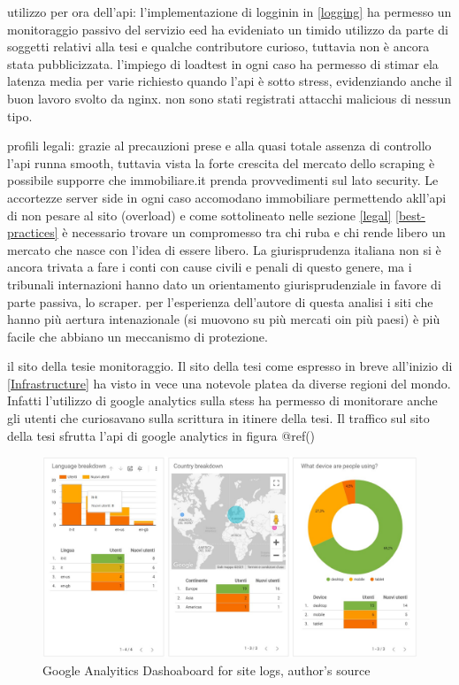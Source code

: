 \documentclass[
  12pt,
  a4paper,
  oneside]{book}
\theoremstyle{definition}
\theoremstyle{definition}
\theoremstyle{definition}
\theoremstyle{remark}
\begin{document}
utilizzo per ora dell'api: l'implementazione di logginin in \ref{logging} ha permesso un monitoraggio passivo del servizio eed ha evideniato un timido utilizzo da parte di soggetti relativi alla tesi e qualche contributore curioso, tuttavia non è ancora stata pubblicizzata. l'impiego di loadtest in ogni caso ha permesso di stimar ela latenza media per varie richiesto quando l'api è sotto stress, evidenziando anche il buon lavoro svolto da nginx. non sono stati registrati attacchi malicious di nessun tipo.

profili legali: grazie al precauzioni prese e alla quasi totale assenza di controllo l'api runna smooth, tuttavia vista la forte crescita del mercato dello scraping è possibile supporre che immobiliare.it prenda provvedimenti sul lato security. Le accortezze server side in ogni caso accomodano immobiliare permettendo akll'api di non pesare al sito (overload) e come sottolineato nelle sezione \ref{legal} \ref{best-practices} è necessario trovare un compromesso tra chi ruba e chi rende libero un mercato che nasce con l'idea di essere libero. La giurisprudenza italiana non si è ancora trivata a fare i conti con cause civili e penali di questo genere, ma i tribunali internazioni hanno dato un orientamento giurisprudenziale in favore di parte passiva, lo scraper. per l'esperienza dell'autore di questa analisi i siti che hanno più aertura intenazionale (si muovono su più mercati oin più paesi) è più facile che abbiano un meccanismo di protezione.

il sito della tesie monitoraggio. Il sito della tesi come espresso in breve all'inizio di \ref{Infrastructure} ha visto in vece una notevole platea da diverse regioni del mondo. Infatti l'utilizzo di google analytics sulla stess ha permesso di monitorare anche gli utenti che curiosavano sulla scrittura in itinere della tesi. Il traffico sul sito della tesi sfrutta l'api di google analytics in figura @ref()

\begin{figure}
\centering
\includegraphics{images/analytics_dashbboard.jpg}
\caption{\label{fig:gaanalytics}Google Analyitics Dashoaboard for site logs, author's source}
\end{figure}
\end{document}
